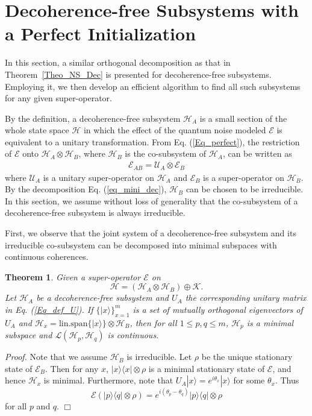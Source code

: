 \documentclass[journal]{IEEEtran}
\def\h{\ensuremath{\mathcal{H}}}
\def\l{\ensuremath{\mathcal{L}}}
\def\u{\ensuremath{\mathcal{U}}}
\def\k{\ensuremath{\mathcal{K}}}
\def\u{\ensuremath{\mathcal{U}}}
\def\e{\ensuremath{\mathcal{E}}}
\def\l{\ensuremath{\mathcal{L}}}
\def\l{\mathcal{L}}
\def\k{\mathcal{K}}
\newtheorem{theorem}{Theorem}
\begin{document}
\section{Decoherence-free Subsystems with a Perfect Initialization}
In this section, a similar orthogonal decomposition as that in Theorem~\ref{Theo_NS_Dec} is presented for decoherence-free subsystems. Employing it, we then develop an efficient algorithm to find all such subsystems for any given super-operator. 

By the definition, a decoherence-free subsystem $\h_A$  is a small section of the whole state space $\h$ in which the effect of the quantum noise modeled $\e$ is equivalent to a unitary transformation. From Eq. (\ref{Eq_perfect}), the restriction of $\e$ onto $\h_A\otimes\h_B $, where $\h_B$ is the co-subsystem of $\h_A$, can be written as \begin{eqnarray}\label{eq_dfs_form}
  \e_{AB}=\u_A\otimes \e_{B}
\end{eqnarray} where $\u_A$ is a unitary super-operator on $\h_A$ and $\e_B$ is a super-operator on $\h_{B}.$  By the decomposition Eq. (\ref{eq_mini_dec}), $\h_B$ can be chosen to be  irreducible. In this section, we assume without loss of generality that the co-subsystem of a decoherence-free subsystem is always irreducible. 

First, we observe that  the joint system of a decoherence-free subsystem and its irreducible co-subsystem can be decomposed into minimal subspaces with continuous coherences. 
\begin{theorem}\label{Theo_dfs_cc}
    Given a super-operator $\e$ on 
    $$\h=(\h_A\otimes\h_B)\oplus \k.$$ 
    Let $\h_A$ be a decoherence-free subsystem and $U_A$ the corresponding unitary matrix in Eq. (\ref{Eq_def_U}). If  $\{|x\rangle\}_{x=1}^{m}$ is a set of mutually orthogonal eigenvectors of $U_A$ and $\h_x=\textrm{lin.span}\{|x\rangle\}\otimes \h_B$, then for all $1\leq p,q\leq m$,  $\h_p$  is a minimal subspace and
    $\l(\h_p,\h_q)$ is continuous.
  \end{theorem}  

{\it Proof.} Note that we assume $\h_B$ is irreducible. Let $\rho$ be the unique stationary state of $\e_B$.  Then for any $x$, $|x\rangle\langle x|\otimes \rho$ is a minimal stationary state of $\e$, and hence $\h_x$ is minimal. Furthermore, note that $U_A|x\rangle=e^{i\theta_x}|x\rangle$ for some $\theta_x$. Thus $$\e(|p\rangle\langle q|\otimes \rho)=e^{i(\theta_p-\theta_q)}|p\rangle\langle q|\otimes \rho$$ for all $p$ and $q.$
\hfill $\Box$
\end{document}
